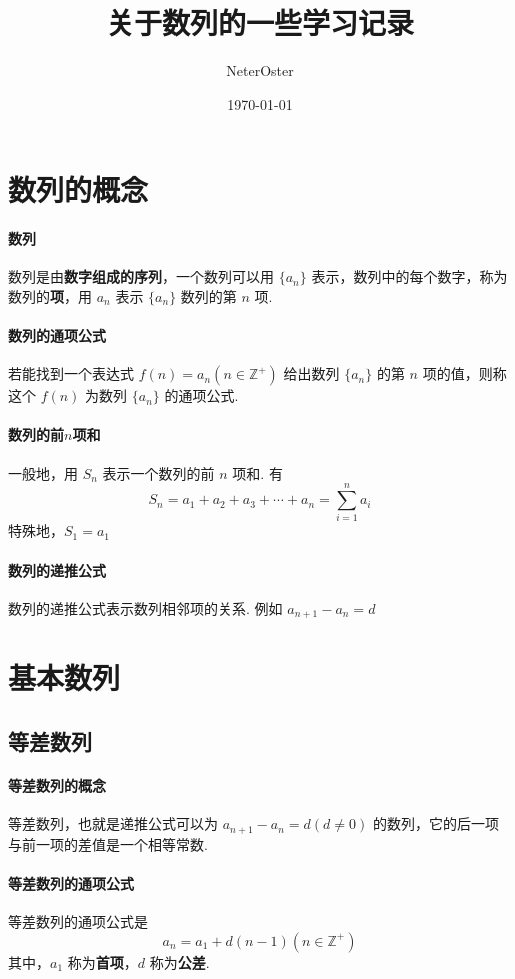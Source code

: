 \documentclass[UTF8]{ctexart}
\title{关于数列的一些学习记录}
\author{NeterOster}
\date{\today}
\def\inlinedisplay#1{$\displaystyle #1$}
\begin{document}
	\maketitle
	\section{数列的概念}
	\paragraph{数列}
	数列是由\textbf{数字组成的序列}，一个数列可以用 $\{a_n\}$ 表示，数列中的每个数字，称为数列的\textbf{项}，用 $a_n$ 表示 $\{a_n\}$ 数列的第 $n$ 项.
	\paragraph{数列的通项公式}
	若能找到一个表达式 \inlinedisplay{f(n) = a_n (n \in \mathbb{Z} ^ +)} 给出数列 $\{a_n\}$ 的第 $n$ 项的值，则称这个 $f(n)$ 为数列 $\{a_n\}$ 的通项公式.
	\paragraph{数列的前$n$项和}
	一般地，用 $S_n$ 表示一个数列的前 $n$ 项和. 有 
	\[S_n=a_1+a_2+a_3+\cdots+a_n=\sum_{i=1}^n a_i\]
	特殊地，$S_1=a_1$
	\paragraph{数列的递推公式}
	数列的递推公式表示数列相邻项的关系. 例如 \inlinedisplay{a_{n+1}-a_n = d}
	
	\section{基本数列}
	\subsection{等差数列}
	\paragraph{等差数列的概念}
	等差数列，也就是递推公式可以为 \inlinedisplay{a_{n+1}-a_n=d (d \ne 0)} 的数列，它的后一项与前一项的差值是一个相等常数.
	\paragraph{等差数列的通项公式}
	等差数列的通项公式是
	\[a_n = a_1 + d(n-1) (n \in \mathbb{Z} ^ +)\]
	其中，$a_1$ 称为\textbf{首项}，$d$ 称为\textbf{公差}.
\end{document}
